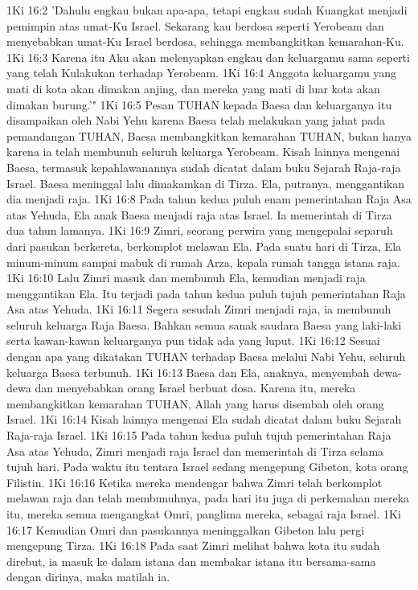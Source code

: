 1Ki 16:2  'Dahulu engkau bukan apa-apa, tetapi engkau sudah Kuangkat menjadi pemimpin atas umat-Ku Israel. Sekarang kau berdosa seperti Yerobeam dan menyebabkan umat-Ku Israel berdosa, sehingga membangkitkan kemarahan-Ku.
1Ki 16:3  Karena itu Aku akan melenyapkan engkau dan keluargamu sama seperti yang telah Kulakukan terhadap Yerobeam.
1Ki 16:4  Anggota keluargamu yang mati di kota akan dimakan anjing, dan mereka yang mati di luar kota akan dimakan burung.'"
1Ki 16:5  Pesan TUHAN kepada Baesa dan keluarganya itu disampaikan oleh Nabi Yehu karena Baesa telah melakukan yang jahat pada pemandangan TUHAN, Baesa membangkitkan kemarahan TUHAN, bukan hanya karena ia telah membunuh seluruh keluarga Yerobeam. Kisah lainnya mengenai Baesa, termasuk kepahlawanannya sudah dicatat dalam buku Sejarah Raja-raja Israel. Baesa meninggal lalu dimakamkan di Tirza. Ela, putranya, menggantikan dia menjadi raja.
1Ki 16:8  Pada tahun kedua puluh enam pemerintahan Raja Asa atas Yehuda, Ela anak Baesa menjadi raja atas Israel. Ia memerintah di Tirza dua tahun lamanya.
1Ki 16:9  Zimri, seorang perwira yang mengepalai separuh dari pasukan berkereta, berkomplot melawan Ela. Pada suatu hari di Tirza, Ela minum-minum sampai mabuk di rumah Arza, kepala rumah tangga istana raja.
1Ki 16:10  Lalu Zimri masuk dan membunuh Ela, kemudian menjadi raja menggantikan Ela. Itu terjadi pada tahun kedua puluh tujuh pemerintahan Raja Asa atas Yehuda.
1Ki 16:11  Segera sesudah Zimri menjadi raja, ia membunuh seluruh keluarga Raja Baesa. Bahkan semua sanak saudara Baesa yang laki-laki serta kawan-kawan keluarganya pun tidak ada yang luput.
1Ki 16:12  Sesuai dengan apa yang dikatakan TUHAN terhadap Baesa melalui Nabi Yehu, seluruh keluarga Baesa terbunuh.
1Ki 16:13  Baesa dan Ela, anaknya, menyembah dewa-dewa dan menyebabkan orang Israel berbuat dosa. Karena itu, mereka membangkitkan kemarahan TUHAN, Allah yang harus disembah oleh orang Israel.
1Ki 16:14  Kisah lainnya mengenai Ela sudah dicatat dalam buku Sejarah Raja-raja Israel.
1Ki 16:15  Pada tahun kedua puluh tujuh pemerintahan Raja Asa atas Yehuda, Zimri menjadi raja Israel dan memerintah di Tirza selama tujuh hari. Pada waktu itu tentara Israel sedang mengepung Gibeton, kota orang Filistin.
1Ki 16:16  Ketika mereka mendengar bahwa Zimri telah berkomplot melawan raja dan telah membunuhnya, pada hari itu juga di perkemahan mereka itu, mereka semua mengangkat Omri, panglima mereka, sebagai raja Israel.
1Ki 16:17  Kemudian Omri dan pasukannya meninggalkan Gibeton lalu pergi mengepung Tirza.
1Ki 16:18  Pada saat Zimri melihat bahwa kota itu sudah direbut, ia masuk ke dalam istana dan membakar istana itu bersama-sama dengan dirinya, maka matilah ia.
